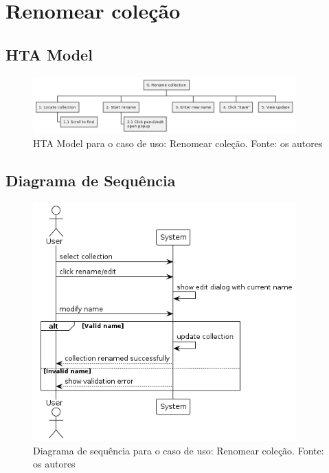 \section{Renomear coleção}

\subsection{HTA Model}

\begin{figure}[H]
    \centering
    \includegraphics[width=0.9\textwidth]{../figures/hta/UC008.png}
    \caption{HTA Model para o caso de uso: Renomear coleção. Fonte: os autores}
    \label{fig:hta-uc008}
\end{figure}

\subsection{Diagrama de Sequência}

\begin{figure}[H]
    \centering
    \includegraphics[width=0.9\textwidth]{../figures/dss/UC008.png}
    \caption{Diagrama de sequência para o caso de uso: Renomear coleção. Fonte: os autores}
    \label{fig:dss-uc008}
\end{figure}

